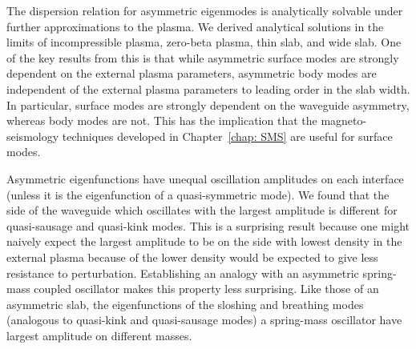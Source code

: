 \documentclass[12pt]{ociamthesis}
\begin{document}
The dispersion relation for asymmetric eigenmodes is analytically solvable under further approximations to the plasma. We derived analytical solutions in the limits of incompressible plasma, zero-beta plasma, thin slab, and wide slab. One of the key results from this is that while asymmetric surface modes are strongly dependent on the external plasma parameters, asymmetric body modes are independent of the external plasma parameters to leading order in the slab width. In particular, surface modes are strongly dependent on the waveguide asymmetry, whereas body modes are not. This has the implication that the magneto-seismology techniques developed in Chapter~\ref{chap: SMS} are useful for surface modes.

Asymmetric eigenfunctions have unequal oscillation amplitudes on each interface (unless it is the eigenfunction of a quasi-symmetric mode). We found that the side of the waveguide which oscillates with the largest amplitude is different for quasi-sausage and quasi-kink modes. This is a surprising result because one might naively expect the largest amplitude to be on the side with lowest density in the external plasma because of the lower density would be expected to give less resistance to perturbation. Establishing an analogy with an asymmetric spring-mass coupled oscillator makes this property less surprising. Like those of an asymmetric slab, the eigenfunctions of the sloshing and breathing modes (analogous to quasi-kink and quasi-sausage modes) a spring-mass oscillator have largest amplitude on different masses.


\end{document}
